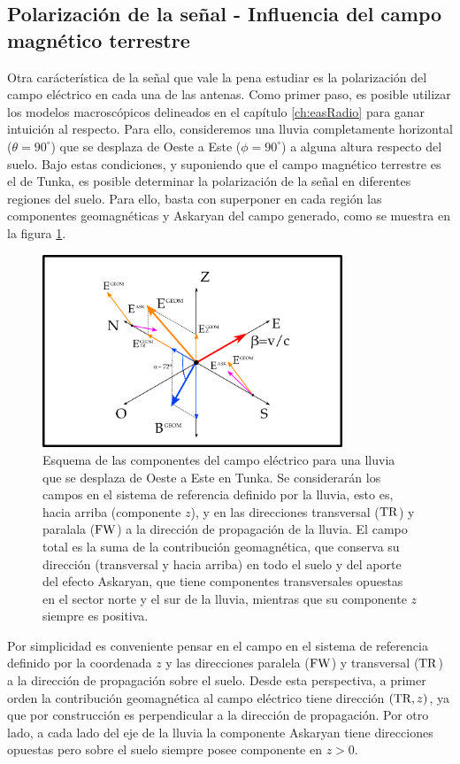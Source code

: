	\subsection{Polarización de la señal - Influencia del campo magn\'etico terrestre}
	
	Otra car\'acter\'istica de la se\~nal que vale la pena estudiar es la polarizaci\'on del campo el\'ectrico en cada una de las antenas.
	Como primer paso, es posible utilizar los modelos macrosc\'opicos delineados en el cap\'itulo \ref{ch:easRadio} para ganar intuici\'on al respecto. 
	Para ello, consideremos una lluvia completamente horizontal ($\theta=90^\circ$) que se desplaza de Oeste a Este ($\phi=90^\circ$) a alguna altura respecto del suelo.
	Bajo estas condiciones, y suponiendo que el campo magn\'etico terrestre es el de Tunka, es posible determinar la polarizaci\'on de la se\~nal en diferentes regiones del suelo.
	Para ello, basta con superponer en cada regi\'on las componentes geomagn\'eticas y Askaryan del campo generado, como se muestra en la figura \ref{fig:malField}.
	\begin{figure}[ht!]
		\centering
		\includegraphics[width=0.8\textwidth]{./fig/simulacionRadio/malField}
		\caption{\label{fig:malField}
		Esquema de las componentes del campo el\'ectrico para una lluvia que se desplaza de Oeste a Este en Tunka. Se considerarán los campos en el sistema de referencia definido por la lluvia, esto es, hacia arriba (componente $z$), y en las direcciones transversal (${\rm TR}$) y paralala (${\rm FW}$) a la dirección de propagación de la lluvia.
		El campo total es la suma de la contribución geomagnética, que conserva su dirección (transversal y hacia arriba) en todo el suelo y del aporte del efecto Askaryan, que tiene componentes transversales opuestas en el sector norte y el sur de la lluvia, mientras que su componente $z$ siempre es positiva.
		}
	\end{figure}
	Por simplicidad es conveniente pensar en el campo en el sistema de referencia definido por la coordenada $z$ y las direcciones paralela (${\rm FW}$) y transversal (${\rm TR}$) a la dirección de propagación sobre el suelo.
	Desde esta perspectiva, a primer orden la contribución geomagnética al campo eléctrico tiene dirección $({\rm TR},z)$, ya que por construcción es perpendicular a la dirección de propagación.
	Por otro lado, a cada lado del eje de la lluvia la componente Askaryan tiene direcciones opuestas pero sobre el suelo siempre posee componente en $z>0$.
	
